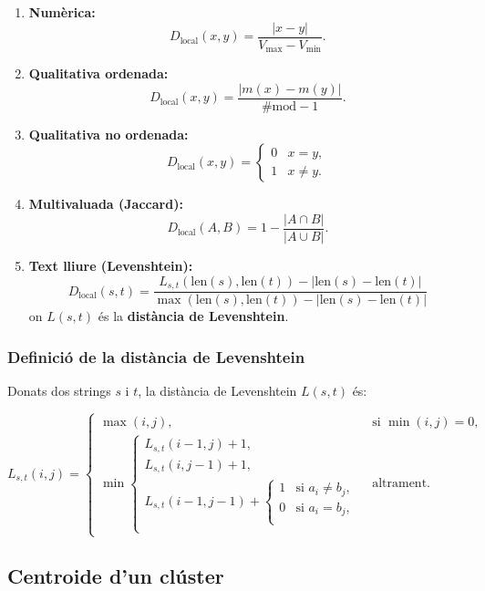 \documentclass[a4paper,11pt]{article}
\begin{document}
\begin{enumerate}
  \item \textbf{Numèrica:}
        \[
          D_\text{local}(x,y)=\frac{|x-y|}{V_{\max}-V_{\min}}.
        \]
  \item \textbf{Qualitativa ordenada:}
        \[
          D_\text{local}(x,y)=\frac{|m(x)-m(y)|}{\#\text{mod}-1}.
        \]
  \item \textbf{Qualitativa no ordenada:}
        \[
          D_\text{local}(x,y)=
          \begin{cases}
            0 & x=y,\\
            1 & x\neq y.
          \end{cases}
        \]
  \item \textbf{Multivaluada (Jaccard):}
        \[
          D_\text{local}(A,B)=1-\frac{|A\cap B|}{|A\cup B|}.
        \]
  \item \textbf{Text lliure (Levenshtein):}
	  \[
		  D_\text{local}(s,t) = \frac{L_{s,t}(\text{len}(s), \text{len}(t)) - \left| \text{len}(s) - \text{len}(t) \right|}{\max(\text{len}(s), \text{len}(t)) - \left| \text{len}(s) - \text{len}(t) \right|}
	\]
        on $L(s,t)$ és la \textbf{distància de Levenshtein}.
\end{enumerate}

\subsubsection*{Definició de la distància de Levenshtein}

Donats dos strings \( s \) i \( t \), la distància de Levenshtein \( L(s,t) \) és:

\[
L_{s,t}(i,j) =
\begin{cases}
\max(i,j), & \text{si } \min(i,j) = 0, \\[10pt]
\min
	\begin{cases}
		L_{s,t}(i-1,j) + 1, \\
		L_{s,t}(i,j-1) + 1, \\
		L_{s,t}(i-1,j-1) + 
	  \begin{cases}
		  1 & \text{si } a_i \neq b_j, \\
		  0 & \text{si } a_i = b_j, \\
	  \end{cases} \\
	\end{cases}
& \text{altrament}.
\end{cases}
\]

\subsection{Centroide d’un clúster}
\end{document}
